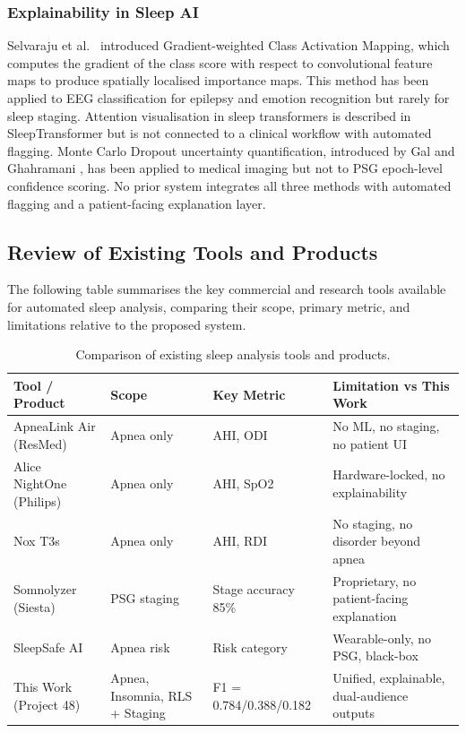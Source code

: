 \subsubsection{Explainability in Sleep AI}

Selvaraju et al.\ \cite{selvaraju2017gradcam} introduced Gradient-weighted Class Activation Mapping, which computes the gradient of the class score with respect to convolutional feature maps to produce spatially localised importance maps. This method has been applied to EEG classification for epilepsy and emotion recognition but rarely for sleep staging. Attention visualisation in sleep transformers is described in SleepTransformer \cite{phan2022sleeptransformer} but is not connected to a clinical workflow with automated flagging. Monte Carlo Dropout uncertainty quantification, introduced by Gal and Ghahramani \cite{gal2016dropout}, has been applied to medical imaging but not to PSG epoch-level confidence scoring. No prior system integrates all three methods with automated flagging and a patient-facing explanation layer.

\subsection{Review of Existing Tools and Products}

The following table summarises the key commercial and research tools available for automated sleep analysis, comparing their scope, primary metric, and limitations relative to the proposed system.

\begin{table}[h]
\centering
\caption{Comparison of existing sleep analysis tools and products.}
\label{tab:tools}
\begin{tabular}{p{3.2cm}p{2.8cm}p{2.2cm}p{5cm}}
\toprule
Tool / Product & Scope & Key Metric & Limitation vs This Work \\
\midrule
ApneaLink Air (ResMed) & Apnea only & AHI, ODI & No ML, no staging, no patient UI \\
Alice NightOne (Philips) & Apnea only & AHI, SpO2 & Hardware-locked, no explainability \\
Nox T3s & Apnea only & AHI, RDI & No staging, no disorder beyond apnea \\
Somnolyzer (Siesta) & PSG staging & Stage accuracy 85\% & Proprietary, no patient-facing explanation \\
SleepSafe AI & Apnea risk & Risk category & Wearable-only, no PSG, black-box \\
This Work (Project 48) & Apnea, Insomnia, RLS + Staging & F1 = 0.784/0.388/0.182 & Unified, explainable, dual-audience outputs \\
\bottomrule
\end{tabular}
\end{table}

